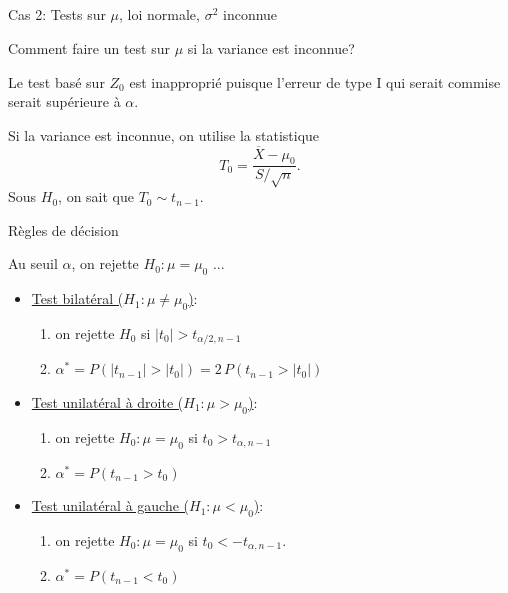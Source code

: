 \documentclass{BeamerTemplate}
\begin{document}
\subsection*{ }


\begin{frame}[t]{Cas 2: Tests sur $\mu$,  loi normale, $\sigma^2$ inconnue}

Comment faire un test sur $\mu$ si la variance est inconnue?

\medskip
Le test basé sur $Z_0$ est inapproprié puisque l'erreur de type I qui serait commise
serait  supérieure à $\alpha$.

\medskip

Si la variance est inconnue, on utilise la statistique
$$
T_0 = \frac{\overline{X}-\mu_0}{S/\sqrt{n}}.
$$
Sous $H_0$, on sait que $T_0\sim t_{n-1}$.

\end{frame}

\begin{frame}[t]{Règles de décision}

{\small
Au seuil $\alpha$, on rejette $H_0:\mu=\mu_0$ ...
\begin{itemize}
\item \underline{Test bilatéral ($H_1 : \mu \ne \mu_0$)}:

    \begin{enumerate}[$\circ$]\itemsep2mm
    \item on rejette $H_0$ si $|t_0| > t_{\alpha/2, n-1}$
    \item $\alpha^*=P(|t_{n-1}|>|t_0|)=2\,P(t_{n-1}>|t_0|)$
    \end{enumerate}

\item \underline{Test unilatéral à droite ($H_1 : \mu > \mu_0$)}:

    \begin{enumerate}[$\circ$]\itemsep2mm
    \item on rejette $H_0 : \mu = \mu_0$  si $t_0 > t_{\alpha, n-1}$
    \item $\alpha^*=P(t_{n-1}>t_0)$
    \end{enumerate}

\item \underline{Test unilatéral à gauche ($H_1 : \mu < \mu_0$)}:

    \begin{enumerate}[$\circ$]\itemsep2mm
    \item on rejette $H_0 : \mu = \mu_0$ si $t_0 < -t_{\alpha, n-1}$.
    \item $\alpha^*=P(t_{n-1}<t_0)$
    \end{enumerate}
\end{itemize}
}
\end{frame}
\end{document}
